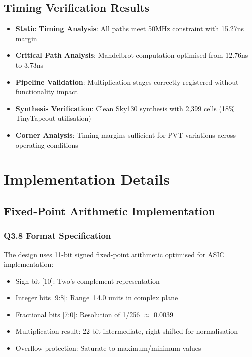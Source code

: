 \documentclass[11pt,a4paper]{article}
\begin{document}
\subsection{Timing Verification Results}
\begin{itemize}
\item \textbf{Static Timing Analysis}: All paths meet 50MHz constraint with 15.27ns margin
\item \textbf{Critical Path Analysis}: Mandelbrot computation optimised from 12.76ns to 3.73ns
\item \textbf{Pipeline Validation}: Multiplication stages correctly registered without functionality impact
\item \textbf{Synthesis Verification}: Clean Sky130 synthesis with 2,399 cells (18\% TinyTapeout utilisation)
\item \textbf{Corner Analysis}: Timing margins sufficient for PVT variations across operating conditions
\end{itemize}

\newpage
\section{Implementation Details}

\subsection{Fixed-Point Arithmetic Implementation}

\subsubsection{Q3.8 Format Specification}
The design uses 11-bit signed fixed-point arithmetic optimised for ASIC implementation:
\begin{itemize}
\item Sign bit [10]: Two's complement representation
\item Integer bits [9:8]: Range ±4.0 units in complex plane
\item Fractional bits [7:0]: Resolution of 1/256 $\approx$ 0.0039
\item Multiplication result: 22-bit intermediate, right-shifted for normalisation
\item Overflow protection: Saturate to maximum/minimum values
\end{itemize}
\end{document}
